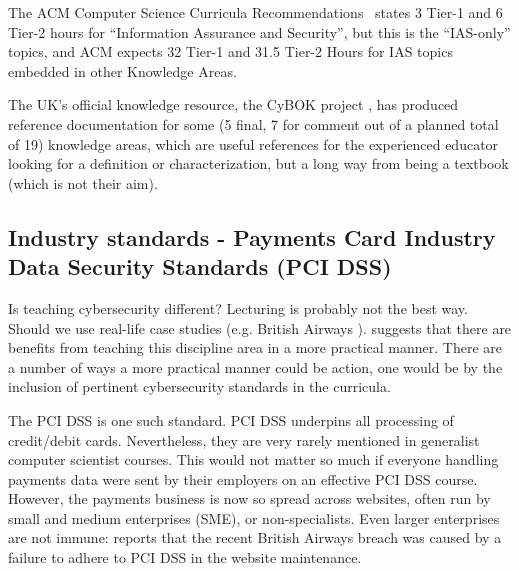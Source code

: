 \documentclass[conference]{IEEEtran}
\begin{document}
The ACM Computer Science Curricula Recommendations~\cite{ACM2013a} states 3 Tier-1 and 6 Tier-2 hours for ``Information Assurance and Security'', but this is the ``IAS-only'' topics, and ACM expects 32 Tier-1 and 31.5 Tier-2 Hours for IAS topics embedded in other Knowledge Areas.

The UK's official knowledge resource, the CyBOK project \cite{Bristol2019a}, has produced reference documentation for some (5  final, 7 for comment out of a planned total of 19)   %
knowledge areas, which are useful references for the experienced educator looking for a definition or characterization, but a long way from being a textbook (which is not their aim).


\subsection{Industry standards - Payments Card Industry Data Security Standards (PCI DSS)}\label{sec:PCIDSS}
Is teaching cybersecurity different? Lecturing is probably not the best way. Should we use real-life case studies (e.g. British Airways \cite{Barth2018a}). \cite{Weiss:2013:THC:2527148.2527180} suggests that there are benefits from teaching this discipline area in a more practical manner.  There are a number of ways a more practical manner could be action, one would be by the inclusion of pertinent cybersecurity standards in the curricula.

The PCI DSS \cite{PCI2018b} is one such standard. PCI DSS underpins all processing of credit/debit cards. Nevertheless, they are very rarely mentioned in generalist computer scientist courses. This would not matter so much if everyone handling payments data were sent by their employers on an effective PCI DSS course. However, the payments business is now so spread across websites, often run by small and medium enterprises (SME), or non-specialists.  Even larger enterprises are not immune: \cite{Barth2018a} reports that the recent British Airways breach was caused by a failure to adhere to PCI DSS in the website maintenance. 
\end{document}
